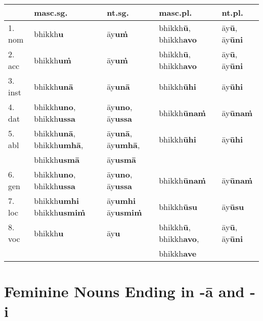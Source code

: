\documentclass[a4paper]{memoir}
\begin{document}
\begin{center}
\begin{tabular}{lllll}
 & \textbf{masc.sg.} & \textbf{nt.sg.} & \textbf{masc.pl.} & \textbf{nt.pl.}\\[0pt]
\hline
1. nom & bhikkh\textbf{u} & āy\textbf{uṁ} & bhikkh\textbf{ū}, bhikkh\textbf{avo} & āy\textbf{ū}, āy\textbf{ūni}\\[0pt]
2. acc & bhikkh\textbf{uṁ} & āy\textbf{uṁ} & bhikkh\textbf{ū}, bhikkh\textbf{avo} & āy\textbf{ū}, āy\textbf{ūni}\\[0pt]
3. inst & bhikkh\textbf{unā} & āy\textbf{unā} & bhikkh\textbf{ūhi} & āy\textbf{ūhi}\\[0pt]
4. dat & bhikkh\textbf{uno}, bhikkh\textbf{ussa} & āy\textbf{uno}, āy\textbf{ussa} & bhikkh\textbf{ūnaṁ} & āy\textbf{ūnaṁ}\\[0pt]
5. abl & bhikkh\textbf{unā}, bhikkh\textbf{umhā}, & āy\textbf{unā}, āy\textbf{umhā}, & bhikkh\textbf{ūhi} & āy\textbf{ūhi}\\[0pt]
 & bhikkh\textbf{usmā} & āy\textbf{usmā} &  & \\[0pt]
6. gen & bhikkh\textbf{uno}, bhikkh\textbf{ussa} & āy\textbf{uno}, āy\textbf{ussa} & bhikkh\textbf{ūnaṁ} & āy\textbf{ūnaṁ}\\[0pt]
7. loc & bhikkh\textbf{umhi} bhikkh\textbf{usmiṁ} & āy\textbf{umhi} āy\textbf{usmiṁ} & bhikkh\textbf{ūsu} & āy\textbf{ūsu}\\[0pt]
8. voc & bhikkh\textbf{u} & āy\textbf{u} & bhikkh\textbf{ū}, bhikkh\textbf{avo}, & āy\textbf{ū}, āy\textbf{ūni}\\[0pt]
 &  &  & bhikkh\textbf{ave} & \\[0pt]
\end{tabular}
\end{center}

\section{Feminine Nouns Ending in -ā and -i}
\label{sec:org415f794}
\end{document}
